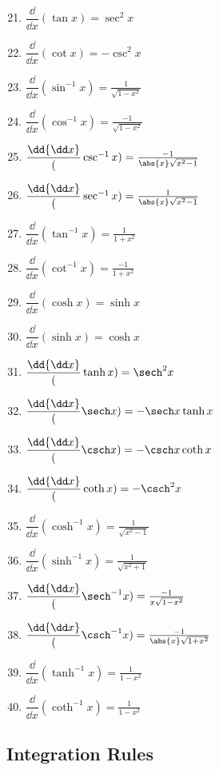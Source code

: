 \parbox{.22\linewidth}{%
\begin{enumerate}\setcounter{enumi}{20}
\item $\dfrac\dd{\dd x}(\tan x)=\sec^2x$
\item $\dfrac\dd{\dd x}(\cot x)=-\csc^2x$
\item $\dfrac\dd{\dd x}(\sin^{-1}x)=\frac1{\sqrt{1-x^2}}$
\item $\dfrac\dd{\dd x}(\cos^{-1}x)=\frac{-1}{\sqrt{1-x^2}}$
\item $\dfrac\dd{\dd x}(\csc^{-1}x)=\frac{-1}{\abs{x}\sqrt{x^2-1}}$
\item $\dfrac\dd{\dd x}(\sec^{-1}x)=\frac1{\abs{x}\sqrt{x^2-1}}$%
\item $\dfrac\dd{\dd x}(\tan^{-1}x)=\frac1{1+x^2}$
\item $\dfrac\dd{\dd x}(\cot^{-1}x)=\frac{-1}{1+x^2}$
\item $\dfrac\dd{\dd x}(\cosh x)=\sinh x$
\item $\dfrac\dd{\dd x}(\sinh x)=\cosh x$
\end{enumerate}}\hfill
\parbox{.25\linewidth}{%
\begin{enumerate}\setcounter{enumi}{30}
\item $\dfrac\dd{\dd x}(\tanh x)=\sech^2x$
\item $\dfrac\dd{\dd x}(\sech x)=-\sech x\tanh x$
\item $\dfrac\dd{\dd x}(\csch x)=-\csch x\coth x$
\item $\dfrac\dd{\dd x}(\coth x)=-\csch^2 x$
\item $\dfrac\dd{\dd x}(\cosh^{-1}x)=\frac1{\sqrt{x^2-1}}$
\item $\dfrac\dd{\dd x}(\sinh^{-1}x)=\frac1{\sqrt{x^2+1}}$
\item $\dfrac\dd{\dd x}(\sech^{-1}x)=\frac{-1}{x\sqrt{1-x^2}}$
\item $\dfrac\dd{\dd x}(\csch^{-1}x)=\frac{-1}{\abs{x}\sqrt{1+x^2}}$
\item $\dfrac\dd{\dd x}(\tanh^{-1}x)=\frac1{1-x^2}$
\item $\dfrac\dd{\dd x}(\coth^{-1}x)=\frac1{1-x^2}$
\end{enumerate}}

\vfill

\subsection{Integration Rules}


